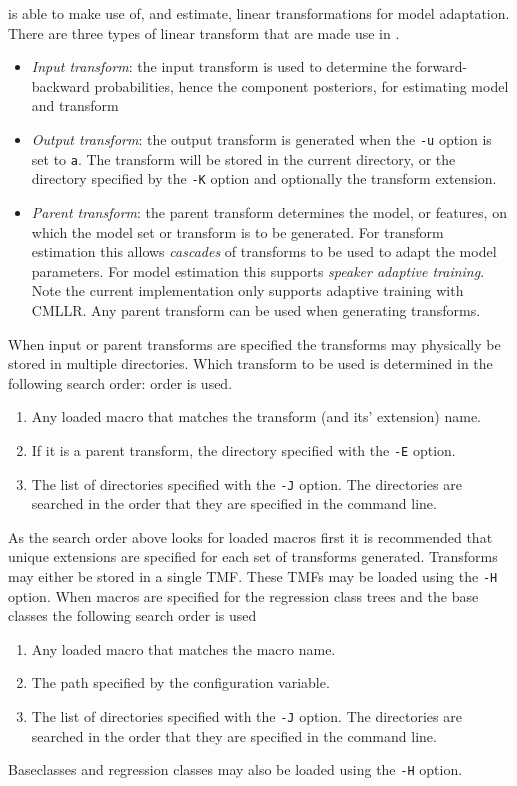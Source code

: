  is able to make use of, and estimate, linear
transformations for model adaptation. There are three types of linear
transform that are made use in .
\begin{itemize}
\item {\it Input transform}: the input transform is used to determine
the forward-backward probabilities, hence the component posteriors, for 
estimating model and transform 
\item {\it Output transform}: the output transform is generated when the 
{\tt -u} option is set to {\tt a}. The transform will be stored in the 
current directory, or the directory specified by the {\tt -K} option
and optionally the transform extension.
\item {\it Parent transform}: the parent transform determines the 
model, or features, on which the model set or transform is to be 
generated. For transform estimation this allows {\em cascades} of transforms
to be used to adapt the model parameters. For model estimation this 
supports {\em speaker adaptive training}. Note the current implementation 
only supports adaptive training with CMLLR. Any parent transform can be
used when generating transforms.
\end{itemize}
When input or parent transforms are specified the transforms may 
physically be stored in multiple directories. Which transform to be used 
is determined in the following search order:
order is used.
\begin{enumerate}
\item Any loaded macro that matches the transform (and its' extension) name.
\item If it is a parent transform, the directory specified with the 
{\tt -E} option.
\item The list of directories specified with the {\tt -J} option.
The directories are searched in the order that they are specified
in the command line.
\end{enumerate}
As the search order above looks for loaded macros first it is 
recommended that unique extensions are specified for each set of
transforms generated. Transforms may either be stored in 
a single TMF. These TMFs may be loaded using the {\tt -H} option.
When macros are specified for the regression class trees and 
the base classes the following search order is used
\begin{enumerate}
\item Any loaded macro that matches the macro name.
\item The path specified by the configuration variable.
\item The list of directories specified with the {\tt -J} option.
The directories are searched in the order that they are specified
in the command line.
\end{enumerate}
Baseclasses and regression classes may also be loaded using the 
{\tt -H} option.

